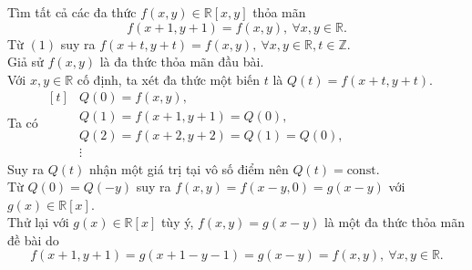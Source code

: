 \begin{bt}
Tìm tất cả các đa thức $ f(x, y)\in\mathbb{R}[x, y] $ thỏa mãn \begin{equation*}
f(x+1, y+1)=f(x, y),\ \forall x, y\in \mathbb{R}.\tag{1}
\end{equation*}
\loigiai
{Từ $ (1) $ suy ra $ f(x+t, y+t)=f(x, y),\ \forall x, y\in\mathbb{R}, t\in\mathbb{Z} $.\\
Giả sử $ f(x, y) $ là đa thức thỏa mãn đầu bài.\\
Với $ x, y\in \mathbb{R} $ cố định, ta xét đa thức một biến $ t $ là $ Q(t)=f(x+t, y+t) $.\\
Ta có $ \begin{aligned}[t]
& Q(0)=f(x, y),\\
& Q(1)=f(x+1, y+1)=Q(0), \\
&  Q(2)=f(x+2, y+2)=Q(1)=Q(0),\\
& \vdots
\end{aligned} $\\
Suy ra $ Q(t) $ nhận một giá trị tại vô số  điểm nên $ Q(t)=\text{const} $.\\
 Từ $ Q(0)=Q(-y) $ suy ra $ f(x, y)=f(x-y, 0)=g(x-y) $ với $ g(x)\in\mathbb{R}[x] $.\\
Thử lại với $ g(x)\in\mathbb{R}[x] $ tùy ý, $ f(x, y)=g(x-y) $ là một đa thức thỏa mãn đề bài do $$ f(x+1, y+1)=g(x+1-y-1)=g(x-y)=f(x, y),\ \forall x, y\in\mathbb{R}.$$
	}
\end{bt}

